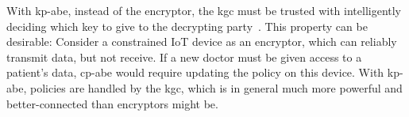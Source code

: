 With \acrshort{kp-abe}, instead of the encryptor, the \acrlong{kgc} must be trusted with intelligently deciding which key to give to the decrypting party~\cite{bethencourt_ciphertext-policy_2007}.
This property can be desirable: Consider a constrained IoT device as an encryptor, which can reliably transmit data, but not receive.
If a new doctor must be given access to a patient's data, \acrshort{cp-abe} would require updating the policy on this device.
With \acrshort{kp-abe}, policies are handled by the \acrshort{kgc}, which is in general much more powerful and better-connected than encryptors might be.






